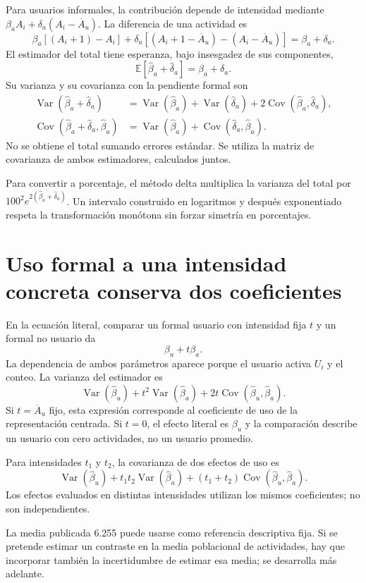 \documentclass[11pt,a4paper]{article}
\newcommand{\E}{\mathbb E}
\DeclareMathOperator{\Var}{Var}
\DeclareMathOperator{\Cov}{Cov}
\begin{document}
Para usuarios informales, la contribución depende de intensidad mediante
$\beta_aA_i+\delta_a(A_i-\overline A_u)$. La diferencia de una actividad es
\[
\beta_a[(A_i+1)-A_i]
+\delta_a[(A_i+1-\overline A_u)-(A_i-\overline A_u)]
=\beta_a+\delta_a.
\]
El estimador del total tiene esperanza, bajo insesgadez de sus componentes,
\[
\E[\widehat\beta_a+\widehat\delta_a]=\beta_a+\delta_a.
\]
Su varianza y su covarianza con la pendiente formal son
\[
\begin{aligned}
\Var(\widehat\beta_a+\widehat\delta_a)
&=\Var(\widehat\beta_a)+\Var(\widehat\delta_a)
+2\Cov(\widehat\beta_a,\widehat\delta_a),\\
\Cov(\widehat\beta_a+\widehat\delta_a,\widehat\beta_a)
&=\Var(\widehat\beta_a)+\Cov(\widehat\delta_a,\widehat\beta_a).
\end{aligned}
\]
No se obtiene el total sumando errores estándar. Se utiliza la matriz de covarianza de ambos estimadores, calculados juntos.

Para convertir a porcentaje, el método delta multiplica la varianza del total por $100^2 e^{2(\widehat\beta_a+\widehat\delta_a)}$. Un intervalo construido en logaritmos y después exponentiado respeta la transformación monótona sin forzar simetría en porcentajes.

\clearpage
\section{Uso formal a una intensidad concreta conserva dos coeficientes}

En la ecuación literal, comparar un formal usuario con intensidad fija $t$ y un formal no usuario da
\[
\beta_u+t\beta_a.
\]
La dependencia de ambos parámetros aparece porque el usuario activa $U_i$ y el conteo. La varianza del estimador es
\[
\Var(\widehat\beta_u)+t^2\Var(\widehat\beta_a)
+2t\Cov(\widehat\beta_u,\widehat\beta_a).
\]
Si $t=\overline A_u$ fijo, esta expresión corresponde al coeficiente de uso de la representación centrada. Si $t=0$, el efecto literal es $\beta_u$ y la comparación describe un usuario con cero actividades, no un usuario promedio.

Para intensidades $t_1$ y $t_2$, la covarianza de dos efectos de uso es
\[
\Var(\widehat\beta_u)
+t_1t_2\Var(\widehat\beta_a)
+(t_1+t_2)\Cov(\widehat\beta_u,\widehat\beta_a).
\]
Los efectos evaluados en distintas intensidades utilizan los mismos coeficientes; no son independientes.

La media publicada 6.255 puede usarse como referencia descriptiva fija. Si se pretende estimar un contraste en la media poblacional de actividades, hay que incorporar también la incertidumbre de estimar esa media; se desarrolla más adelante.
\end{document}

